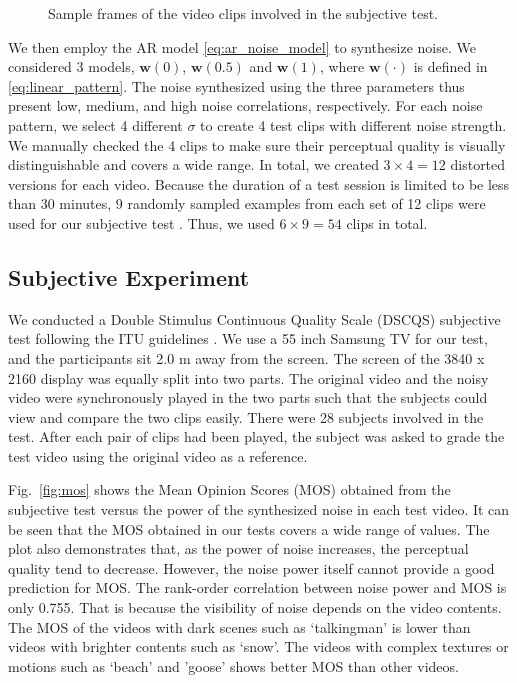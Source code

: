 \documentclass{sig-alternate}
\begin{document}
\begin{figure}[!h]
{}
\caption[Optional caption for list of figures]{
Sample frames of the video clips involved in the subjective test.
}
\label{fig:sampleframe}
\end{figure}

We then employ the AR model \eqref{eq:ar_noise_model} to synthesize noise. We considered 3 models, $\mathbf{w}(0)$, $\mathbf{w}(0.5)$ and $\mathbf{w}(1)$, where $\mathbf{w}(\cdot)$ is defined in \eqref{eq:linear_pattern}. The noise synthesized using the three parameters thus present low, medium, and high noise correlations, respectively. For each noise pattern, we select 4 different $\sigma$ to create 4 test clips with different noise strength. We manually checked the 4 clips to make sure their perceptual quality is visually distinguishable and covers a wide range. In total, we created $3\times4=12$ distorted versions for each video. Because the duration of a test session is limited to be less than 30 minutes, 9 randomly sampled examples from each set of 12 clips were used for our subjective test \cite{ITU}. Thus, we used $6\times9=54$ clips in total.
\subsection{Subjective Experiment}
\label{sec:subjective_study}
We conducted a Double Stimulus Continuous Quality Scale (DSCQS) subjective test following the ITU guidelines \cite{ITU}. We use a 55 inch Samsung TV for our test, and the participants sit 2.0 m away from the screen. 
The screen of the 3840 x 2160 display was equally split into two parts. The original video and the noisy video were synchronously played in the two parts such that the subjects could view and compare the two clips easily. There were 28 subjects involved in the test. After each pair of clips had been played, the subject was asked to grade the test video using the original video as a reference.

Fig.~\ref{fig:mos} shows the Mean Opinion Scores (MOS) obtained from the subjective test versus the power of the synthesized noise in each test video. It can be seen that the MOS obtained in our tests covers a wide range of values. The plot also demonstrates that, as the power of noise increases, the perceptual quality tend to decrease. However, the noise power itself cannot provide a good prediction for MOS. The rank-order correlation between noise power and MOS is only 0.755. That is because the visibility of noise depends on the video contents. The MOS of the videos with dark scenes such as `talkingman' is lower than videos with brighter contents such as `snow'. The videos with complex textures or motions such as `beach' and 'goose' shows better MOS than other videos.
\end{document}
